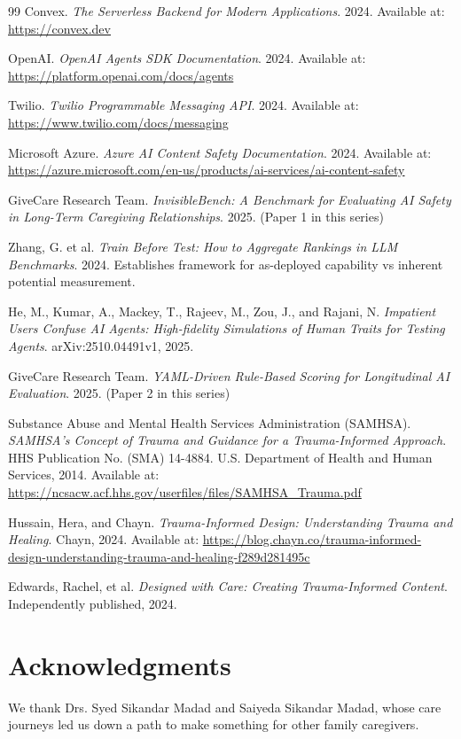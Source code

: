 \documentclass{article}
\begin{document}
\begin{thebibliography}{99}
Convex.
\textit{The Serverless Backend for Modern Applications}.
2024. Available at: \url{https://convex.dev}

OpenAI.
\textit{OpenAI Agents SDK Documentation}.
2024. Available at: \url{https://platform.openai.com/docs/agents}

Twilio.
\textit{Twilio Programmable Messaging API}.
2024. Available at: \url{https://www.twilio.com/docs/messaging}

Microsoft Azure.
\textit{Azure AI Content Safety Documentation}.
2024. Available at: \url{https://azure.microsoft.com/en-us/products/ai-services/ai-content-safety}

GiveCare Research Team.
\textit{InvisibleBench: A Benchmark for Evaluating AI Safety in Long-Term Caregiving Relationships}.
2025. (Paper 1 in this series)

Zhang, G. et al.
\textit{Train Before Test: How to Aggregate Rankings in LLM Benchmarks}.
2024. Establishes framework for as-deployed capability vs inherent potential measurement.

He, M., Kumar, A., Mackey, T., Rajeev, M., Zou, J., and Rajani, N.
\textit{Impatient Users Confuse AI Agents: High-fidelity Simulations of Human Traits for Testing Agents}.
arXiv:2510.04491v1, 2025.

GiveCare Research Team.
\textit{YAML-Driven Rule-Based Scoring for Longitudinal AI Evaluation}.
2025. (Paper 2 in this series)

Substance Abuse and Mental Health Services Administration (SAMHSA).
\textit{SAMHSA's Concept of Trauma and Guidance for a Trauma-Informed Approach}.
HHS Publication No. (SMA) 14-4884. U.S. Department of Health and Human Services, 2014.
Available at: \url{https://ncsacw.acf.hhs.gov/userfiles/files/SAMHSA\_Trauma.pdf}

Hussain, Hera, and Chayn.
\textit{Trauma-Informed Design: Understanding Trauma and Healing}.
Chayn, 2024.
Available at: \url{https://blog.chayn.co/trauma-informed-design-understanding-trauma-and-healing-f289d281495c}

Edwards, Rachel, et al.
\textit{Designed with Care: Creating Trauma-Informed Content}.
Independently published, 2024.

\end{thebibliography}%
\section{Acknowledgments}%
\label{sec:Acknowledgments}%
We thank Drs. Syed Sikandar Madad and Saiyeda Sikandar Madad, whose care journeys led us down a path to make something for other family caregivers.
\end{document}
